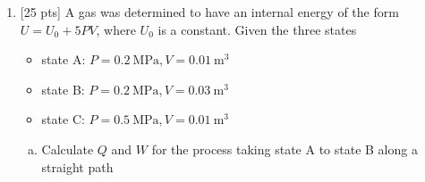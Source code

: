 \begin{enumerate}
\begin{enumerate}[(a)]

    \end{enumerate}

    \pagebreak

  \item {[25 pts]} A gas was determined to have an internal energy of
    the form $U = U_0 + 5PV$, where $U_0$ is a constant. Given the
    three states
    \begin{itemize}[\textbullet]
      \item state A: $P = \SI{0.2}{\mega\pascal},  V =
        \SI{0.01}{\meter\cubed}$
      \item state B: $P = \SI{0.2}{\mega\pascal}, V = \SI{0.03}{\meter\cubed}$
      \item state C: $P = \SI{0.5}{\mega\pascal}, V = \SI{0.01}{\meter\cubed}$
    \end{itemize}


    \begin{enumerate}[(a)]
      \item Calculate $Q$ and $W$ for the process taking state A to
        state B along a straight path


\end{enumerate}
\end{enumerate}
